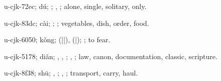 \begin{multicols}{2}
{\cjkgGlue{}u-cjk-72ec; dú; \cjkgGlue{}\cjkgGlue{}\cjkgGlue{}; \cjkgGlue{}, \cjkgGlue{}; alone, single, solitary, only.

\cjkgGlue{}u-cjk-83dc; cài; \cjkgGlue{}; \cjkgGlue{}; vegetables, dish, order, food.

\cjkgGlue{}u-cjk-6050; kǒng; \cjkgGlue{}\cjkgGlue{}(\cjkgGlue{}|\cjkgGlue{}|\cjkgGlue{}), \cjkgGlue{}\cjkgGlue{}(\cjkgGlue{}|\cjkgGlue{}); \cjkgGlue{}; to fear.

\cjkgGlue{}u-cjk-5178; diǎn; \cjkgGlue{}, \cjkgGlue{}, \cjkgGlue{}; \cjkgGlue{}, \cjkgGlue{}; law, canon, documentation, classic, scripture.

\cjkgGlue{}u-cjk-8f38; shū; \cjkgGlue{}, \cjkgGlue{}; \cjkgGlue{}, \cjkgGlue{}; transport, carry, haul.

}
\end{multicols}
